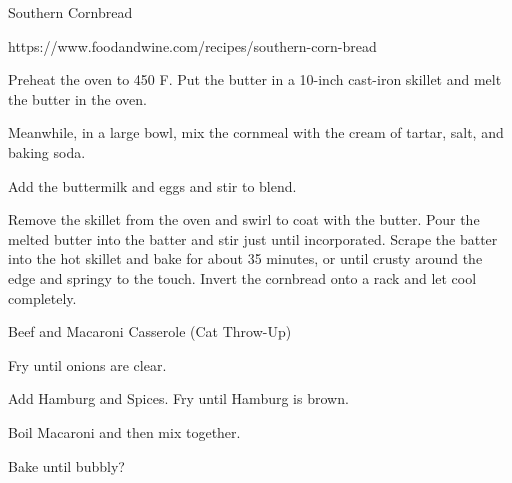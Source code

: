 \documentclass[letterpaper]{book}
\begin{document}
\begin{recipe}{Southern Cornbread}{}{}
    \freeform

    https://www.foodandwine.com/recipes/southern-corn-bread


    Preheat the oven to 450\0 F.
    Put the butter in a 10-inch cast-iron skillet and melt the butter in the oven.



    Meanwhile, in a large bowl, mix the cornmeal with the cream of tartar, salt, and baking soda.


    Add the buttermilk and eggs and stir to blend.

    \newstep

    Remove the skillet from the oven and swirl to coat with the butter. Pour the melted butter into the batter and stir just until incorporated. Scrape the batter into the hot skillet and bake for about 35 minutes, or until crusty around the edge and springy to the touch. Invert the cornbread onto a rack and let cool completely.
\end{recipe}

\begin{recipe}{Beef and Macaroni Casserole (Cat Throw-Up)}{}{}

    Fry until onions are clear.


    Add Hamburg and Spices.
    Fry until Hamburg is brown.


    Boil Macaroni and then mix together.

    \newstep

    Bake until bubbly?

\end{recipe}
\end{document}
